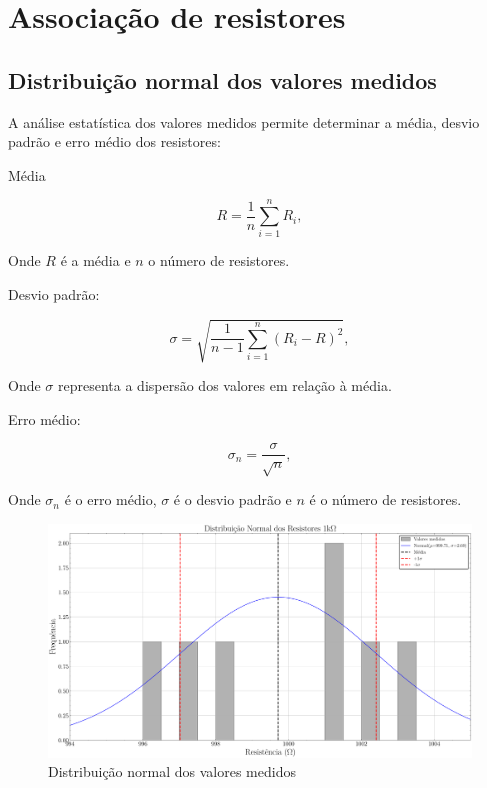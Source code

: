 \documentclass[conference]{IEEEtran}
\begin{document}



\section{Associação de resistores}

\subsection{Distribuição normal dos valores medidos}

A análise estatística dos valores medidos permite determinar a média, desvio padrão e erro médio dos resistores:

Média

\begin{equation}
    R = \frac{1}{n} \sum_{i=1}^{n} R_i,
\end{equation}

\noindent
Onde $R$ é a média e $n$ o número de resistores.

Desvio padrão:

\begin{equation}
    \sigma = \sqrt{\frac{1}{n-1} \sum_{i=1}^{n} (R_i - R)^2},
\end{equation}

\noindent
Onde $\sigma$ representa a dispersão dos valores em relação à média.

Erro médio:

\begin{equation}
    \sigma_n = \frac{\sigma}{\sqrt{n}},
\end{equation}

\noindent
Onde $\sigma_n$ é o erro médio, $\sigma$ é o desvio padrão e $n$ é o número de resistores.

\begin{figure}[htbp]
    \centering
    \caption{Distribuição normal dos valores medidos}
    \label{fig:plot_hist_1k}
    \includegraphics[width=0.8\linewidth]{figures/plot_hist_1k.pdf}
\end{figure}
\end{document}
